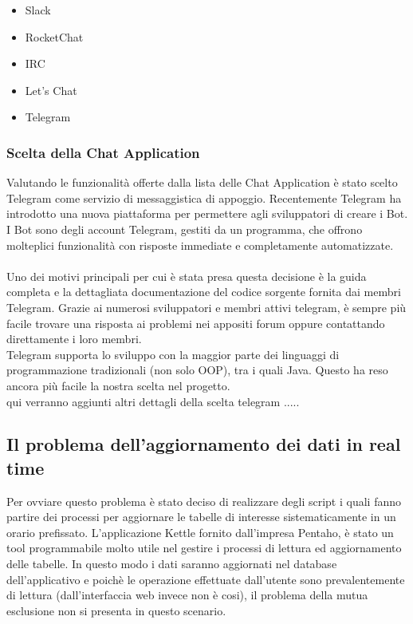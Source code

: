\begin{itemize}
\item Slack 
\item RocketChat
\item IRC
\item Let's Chat
\item Telegram 
\end{itemize}


\subsubsection{Scelta della Chat Application}
Valutando le funzionalità offerte dalla lista delle Chat Application è stato scelto Telegram come servizio di messaggistica di appoggio. Recentemente Telegram ha introdotto una nuova piattaforma per permettere agli sviluppatori di creare i Bot. I Bot sono degli account Telegram, gestiti da un programma, che offrono molteplici funzionalità con risposte immediate e completamente automatizzate. \\\\
Uno dei motivi principali per cui è stata presa questa decisione è la guida completa e la dettagliata documentazione del codice sorgente fornita dai membri Telegram. Grazie ai numerosi sviluppatori e membri attivi telegram, è sempre più facile trovare una risposta ai problemi nei appositi forum oppure contattando direttamente i loro membri.\\ Telegram supporta lo sviluppo con la maggior parte dei linguaggi di programmazione tradizionali (non solo OOP), tra i quali Java. Questo ha reso ancora più facile la nostra scelta nel progetto. \\

qui verranno aggiunti altri dettagli della scelta telegram .....


\subsection{Il problema dell'aggiornamento dei dati in real time}

Per ovviare questo problema è stato deciso di realizzare degli script i quali fanno partire dei processi per aggiornare le tabelle di interesse sistematicamente in un orario prefissato. L'applicazione Kettle fornito dall'impresa Pentaho, è stato un tool programmabile molto utile nel gestire i processi di lettura ed aggiornamento delle tabelle. In questo modo i dati saranno aggiornati nel database dell'applicativo e poichè le operazione effettuate dall'utente sono prevalentemente di lettura (dall'interfaccia web invece non è cosi), il problema della mutua esclusione  non si presenta in questo scenario. 

